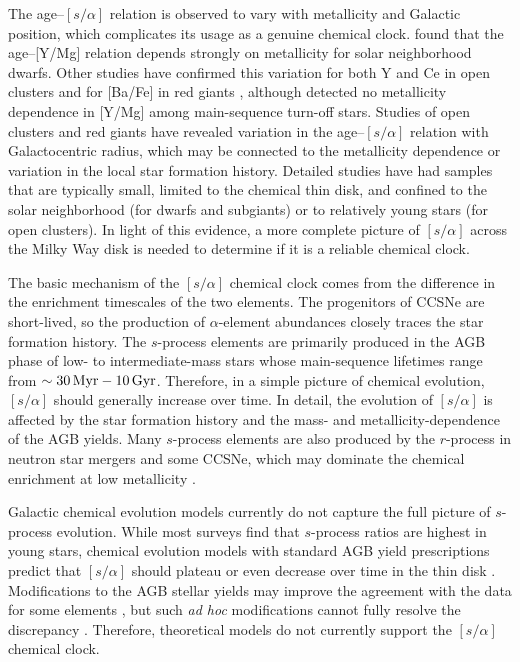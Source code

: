 \documentclass[twocolumn,twocolappendix]{aastex701}
\newcommand{\Myr}{\,{\rm Myr}}
\newcommand{\Gyr}{\,{\rm Gyr}}
\newcommand{\Msun}{\,{\rm M}_\odot}
\begin{document}
The age--$[s/\alpha]$ relation is observed to vary with metallicity and Galactic position, which complicates its usage as a genuine chemical clock. \citet{feltzing_metallicity_2017} found that the age--[Y/Mg] relation depends strongly on metallicity for solar neighborhood dwarfs. Other studies have confirmed this variation for both Y and Ce in open clusters \citep[e.g.,][]{casali_gaia-eso_2020,sales-silva_exploring_2022} and for [Ba/Fe] in red giants \citep{horta_neutron-capture_2022}, although \citet{titarenko_ambre_2019} detected no metallicity dependence in [Y/Mg] among main-sequence turn-off stars. Studies of open clusters \citep{casali_gaia-eso_2020,sales-silva_exploring_2022,viscasillas_vazquez_gaia-eso_2022} and red giants \citep{casali_time_2023,ratcliffe_chemical_2024,pakstiene_calibration_2026} have revealed variation in the age--$[s/\alpha]$ relation with Galactocentric radius, which may be connected to the metallicity dependence or variation in the local star formation history. Detailed studies have had samples that are typically small, limited to the chemical thin disk, and confined to the solar neighborhood (for dwarfs and subgiants) or to relatively young stars (for open clusters). In light of this evidence, a more complete picture of $[s/\alpha]$ across the Milky Way disk is needed to determine if it is a reliable chemical clock.

The basic mechanism of the $[s/\alpha]$ chemical clock comes from the difference in the enrichment timescales of the two elements. The progenitors of CCSNe are short-lived, so the production of $\alpha$-element abundances closely traces the star formation history. The $s$-process elements are primarily produced in the AGB phase of low- to intermediate-mass stars \citep[$\sim1-10\Msun$; see review by][]{karakas_dawes_2014} whose main-sequence lifetimes range from $\sim30\Myr-10\Gyr$. Therefore, in a simple picture of chemical evolution, $[s/\alpha]$ should generally increase over time. In detail, the evolution of $[s/\alpha]$ is affected by the star formation history and the mass- and metallicity-dependence of the AGB yields. Many $s$-process elements are also produced by the $r$-process in neutron star mergers and some CCSNe, which may dominate the chemical enrichment at low metallicity \citep[e.g.,][]{kobayashi_origin_2020}.

Galactic chemical evolution models currently do not capture the full picture of $s$-process evolution. While most surveys find that $s$-process ratios are highest in young stars, chemical evolution models with standard AGB yield prescriptions predict that $[s/\alpha]$ should plateau or even decrease over time in the thin disk \citep[e.g.,][]{grisoni_modelling_2020,ratcliffe_chemical_2024,molero_modelling_2025,casali_modelling_2026}. Modifications to the AGB stellar yields may improve the agreement with the data for some elements \citep{ratcliffe_chemical_2024,molero_constraining_2025}, but such {\it ad hoc} modifications cannot fully resolve the discrepancy \citep{casali_modelling_2026}. Therefore, theoretical models do not currently support the $[s/\alpha]$ chemical clock.
\end{document}
